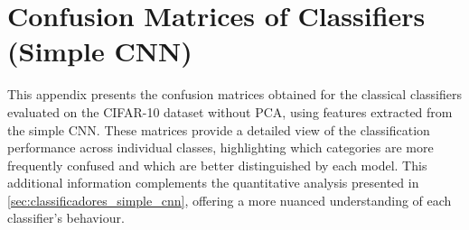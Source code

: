 \documentclass[journal,article,submit,pdftex,moreauthors]{Definitions/mdpi}
\begin{document}



\clearpage
\appendixstart
\appendix
\section[\appendixname~\thesection]{Confusion Matrices of Classifiers (Simple CNN)}
\label{ap:ap1}

This appendix presents the confusion matrices obtained for the classical classifiers evaluated on the CIFAR-10 dataset without PCA, using features extracted from the simple CNN. These matrices provide a detailed view of the classification performance across individual classes, highlighting which categories are more frequently confused and which are better distinguished by each model. This additional information complements the quantitative analysis presented in \autoref{sec:classificadores_simple_cnn}, offering a more nuanced understanding of each classifier’s behaviour.
\end{document}
